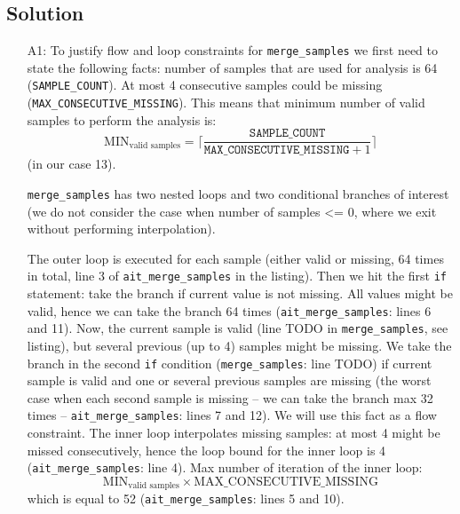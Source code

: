 \documentclass[12pt,a4paper,titlepage,oneside]{article}
\begin{document}
\subsection{Solution}
\begin{itemize}

\item[A1:]
  To justify flow and loop constraints for
  \texttt{merge\_samples} we first need to state the following facts:
  number of samples that are used for analysis is 64
  (\texttt{SAMPLE\_COUNT}). At most 4 consecutive samples could be
  missing (\texttt{MAX\_CONSECUTIVE\_MISSING}). This means that
  minimum number of valid samples to perform the analysis is:
  $${\text{MIN}_\text{valid samples}}  = \lceil\frac{\texttt{SAMPLE\_COUNT}}{\texttt{MAX\_CONSECUTIVE\_MISSING} + 1}\rceil$$
  (in our case 13).
  
  \texttt{merge\_samples} has two nested loops and two conditional
  branches of interest (we do not consider the case when number of
  samples <= 0, where we exit without performing interpolation).

  The outer loop is executed for each sample (either valid or missing,
  64 times in total, line 3 of \texttt{ait\_merge\_samples} in the
  listing). Then we hit the first \texttt{if} statement: take the
  branch if current value is not missing. All values might be valid,
  hence we can take the branch 64 times (\texttt{ait\_merge\_samples}:
  lines 6 and 11). Now, the current sample is valid (line TODO in
  \texttt{merge\_samples}, see listing), but several previous  (up to
  4) samples might be missing. 
  We take the branch in the second \texttt{if} condition (\texttt{merge\_samples}: line
  TODO) if current sample is valid and one or several previous 
  samples are missing
  (the worst case when each second sample is missing -- we
  can take the branch max 32 times -- \texttt{ait\_merge\_samples}: lines 7
  and 12). We will use this fact as a flow
  constraint. The inner loop interpolates missing samples: at most 4
  might be missed consecutively, hence the loop bound for the inner
  loop is 4 (\texttt{ait\_merge\_samples}: line 4). 
  Max number of iteration of the inner loop:
  $$\text{MIN}_\text{valid samples} \times
  \text{MAX\_CONSECUTIVE\_MISSING}$$ which is equal to 52
  (\texttt{ait\_merge\_samples}: lines 5 and 10).


\end{itemize}
\end{document}
